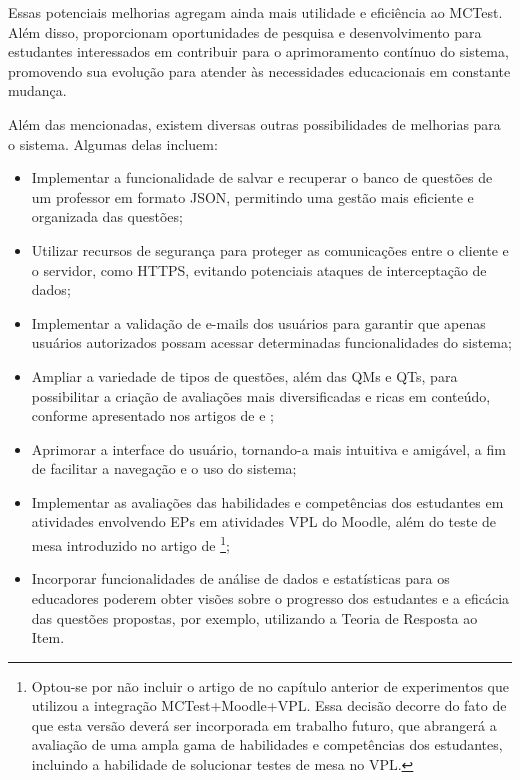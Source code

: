 Essas potenciais melhorias agregam ainda mais utilidade e eficiência ao MCTest. Além disso, proporcionam oportunidades de pesquisa e desenvolvimento para estudantes interessados em contribuir para o aprimoramento contínuo do sistema, promovendo sua evolução para atender às necessidades educacionais em constante mudança.

Além das mencionadas, existem diversas outras possibilidades de melhorias para o sistema. Algumas delas incluem:

\begin{itemize}
    \item  Implementar a funcionalidade de salvar e recuperar o banco de questões de um professor em formato JSON, permitindo uma gestão mais eficiente e organizada das questões;

    \item  Utilizar recursos de segurança para proteger as comunicações entre o cliente e o servidor, como HTTPS, evitando potenciais ataques de interceptação de dados;

    \item  Implementar a validação de e-mails dos usuários para garantir que apenas usuários autorizados possam acessar determinadas funcionalidades do sistema;

    \item Ampliar a variedade de tipos de questões, além das QMs e QTs, para possibilitar a criação de avaliações mais diversificadas e ricas em conteúdo, conforme apresentado nos artigos de  e ;

    \item  Aprimorar a interface do usuário, tornando-a mais intuitiva e amigável, a fim de facilitar a navegação e o uso do sistema;

    \item Implementar as avaliações das habilidades e competências dos estudantes em atividades envolvendo EPs em atividades VPL do Moodle, além do teste de mesa introduzido no artigo de \footnote{Optou-se por não incluir o artigo de  no capítulo anterior de experimentos que utilizou a integração MCTest+Moodle+VPL. Essa decisão decorre do fato de que esta versão deverá ser incorporada em trabalho futuro, que abrangerá a avaliação de uma ampla gama de habilidades e competências dos estudantes, incluindo a habilidade de solucionar testes de mesa no VPL.};

    \item  Incorporar funcionalidades de análise de dados e estatísticas para os educadores poderem obter visões sobre o progresso dos estudantes e a eficácia das questões propostas, por exemplo, utilizando a Teoria de Resposta ao Item.
\end{itemize}

